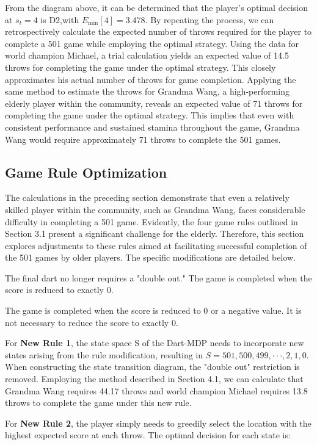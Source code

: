 \documentclass[cjjs]{ipart}
\theoremstyle{plain}
\begin{document}
From the diagram above, it can be determined that the player's optimal decision at $s_t = 4$ is D2,with $E_{\min}[4] = 3.478$. By repeating the process, we can retrospectively calculate the expected number of throws required for the player to complete a 501 game while employing the optimal strategy. Using the data for world champion Michael, a trial calculation yields an expected value of 14.5 throws for completing the game under the optimal strategy. This closely approximates his actual number of throws for game completion. Applying the same method to estimate the throws for Grandma Wang, a high-performing elderly player within the community, reveals an expected value of 71 throws for completing the game under the optimal strategy. This implies that even with consistent performance and sustained stamina throughout the game, Grandma Wang would require approximately 71 throws to complete the 501 games.

\subsection{Game Rule Optimization}

The calculations in the preceding section demonstrate that even a relatively skilled player within the community, such as Grandma Wang, faces considerable difficulty in completing a 501 game. Evidently, the four game rules outlined in Section 3.1 present a significant challenge for the elderly. Therefore, this section explores adjustments to these rules aimed at facilitating successful completion of the 501 games by older players. The specific modifications are detailed below.

The final dart no longer requires a "double out." The game is completed when the score is reduced to exactly 0.

The game is completed when the score is reduced to 0 or a negative value. It is not necessary to reduce the score to exactly 0.

For \textbf{New Rule 1}, the state space S of the Dart-MDP needs to incorporate new states arising from the rule modification, resulting in $S = {501, 500, 499, ···,2, 1, 0}$. When constructing the state transition diagram, the "double out" restriction is removed. Employing the method described in Section 4.1, we can calculate that Grandma Wang requires 44.17 throws and world champion Michael requires 13.8 throws to complete the game under this new rule.

For\textbf{ New Rule 2}, the player simply needs to greedily select the location with the highest expected score at each throw. The optimal decision for each state is:
\end{document}
